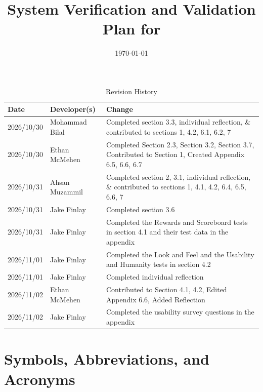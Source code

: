 \documentclass[10pt,titlepage]{article}
\begin{document}
\title{System Verification and Validation Plan for \progname{}} 
\author{\authname}
\date{\today}
	
\maketitle


\begin{table}[!htbp]
\caption{Revision History} \label{TblRevisionHistory}
\begin{tabularx}{\textwidth}{llX}
\toprule
\textbf{Date} & \textbf{Developer(s)} & \textbf{Change}\\
\midrule
2026/10/30 & Mohammad Bilal & Completed section 3.3, individual reflection, \& contributed to sections 1, 4.2, 6.1, 6.2, 7 \\
2026/10/30 & Ethan McMehen & Completed Section 2.3, Section 3.2, Section 3.7, Contributed to Section 1, Created Appendix 6.5, 6.6, 6.7 \\
2026/10/31 & Ahsan Muzammil & Completed section 2, 3.1, individual reflection, \& contributed to sections 1, 4.1, 4.2, 6.4, 6.5, 6.6, 7 \\
2026/10/31 & Jake Finlay & Completed section 3.6 \\
2026/10/31 & Jake Finlay & Completed the Rewards and Scoreboard tests in section 4.1 and their test data in the appendix \\
2026/11/01 & Jake Finlay & Completed the Look and Feel and the Usability and Humanity tests in section 4.2 \\
2026/11/01 & Jake Finlay & Completed individual reflection \\
2026/11/02 & Ethan McMehen & Contributed to Section 4.1, 4.2, Edited Appendix 6.6, Added Reflection \\
2026/11/02 & Jake Finlay & Completed the usability survey questions in the appendix \\
\bottomrule
\end{tabularx}
\end{table}

\newpage

\tableofcontents

\newpage

\listoftables

\newpage

\section{Symbols, Abbreviations, and Acronyms}
\end{document}
